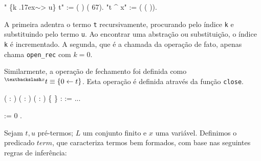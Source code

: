  " \{k {\raise.17ex\hbox{$\scriptstyle\mathtt{\sim}$}}{}> u\}  t" := (   ) (  67).\coqdoceol
{} "t \^{} x" := (  ( )).\coqdoceol
\coqdocemptyline

\bigskip

A primeira adentra o termo \texttt{t} recursivamente, procurando pelo índice
\texttt{k} e substituindo pelo termo \texttt{u}. Ao encontrar uma abstração ou
substituição, o índice \texttt{k} é incrementado.  A segunda, que é a chamada da
operação de fato, apenas chama \texttt{open\_rec} com $k = 0$.

Similarmente, a operação de fechamento foi definida como $ ^{\textbackslash x}t
\equiv \{0 \leftarrow t\}$. Esta operação é definida através da função
\texttt{close}.

\bigskip

   ( :
)
( : ) ( : ) \{ \} :
 := ...\coqdoceol

    :=
 0
 .\coqdoceol

\bigskip

\begin{definicao}\label{def_term}
Sejam $t, u$ pré-termos; $L$ um conjunto finito e $x$ uma variável.
Definimos o predicado $term$, que caracteriza termos bem formados, com base nas
seguintes regras de inferência:

\end{definicao}

